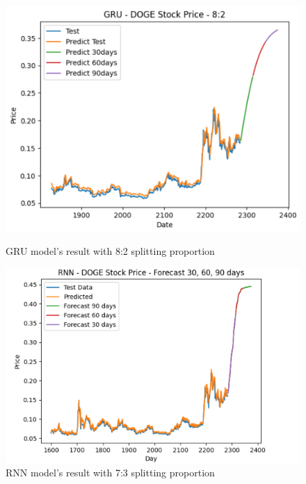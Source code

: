 \documentclass{ieeeojies}
\begin{document}
\begin{figure}[H]
    \centering
    \begin{minipage}{0.23\textwidth}
    \centering
    \includegraphics[width=1\textwidth]{bibliography/gru doge 82.png}
    \caption{GRU model's result with 8:2 splitting proportion}
    \label{fig10}
    \end{minipage}
    \hfill
    \begin{minipage}{0.23\textwidth}
    \centering
    \includegraphics[width=1\textwidth]{bibliography/Figure/PREDICT/RNN/RNN-7-3-DOGE.png}
    \caption{RNN model's result with 7:3 splitting proportion}
    \label{fig11}
    \end{minipage}
\end{figure}
\end{document}
